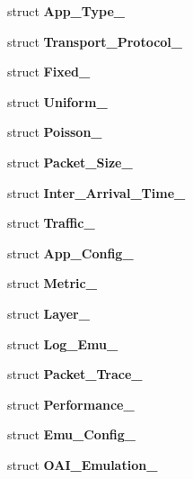 \begin{CompactItemize}
struct {\bf App\_\-Type\_\-}
\item 
struct {\bf Transport\_\-Protocol\_\-}
\item 
struct {\bf Fixed\_\-}
\item 
struct {\bf Uniform\_\-}
\item 
struct {\bf Poisson\_\-}
\item 
struct {\bf Packet\_\-Size\_\-}
\item 
struct {\bf Inter\_\-Arrival\_\-Time\_\-}
\item 
struct {\bf Traffic\_\-}
\item 
struct {\bf App\_\-Config\_\-}
\item 
struct {\bf Metric\_\-}
\item 
struct {\bf Layer\_\-}
\item 
struct {\bf Log\_\-Emu\_\-}
\item 
struct {\bf Packet\_\-Trace\_\-}
\item 
struct {\bf Performance\_\-}
\item 
struct {\bf Emu\_\-Config\_\-}
\item 
struct {\bf OAI\_\-Emulation\_\-}
\end{CompactItemize}
